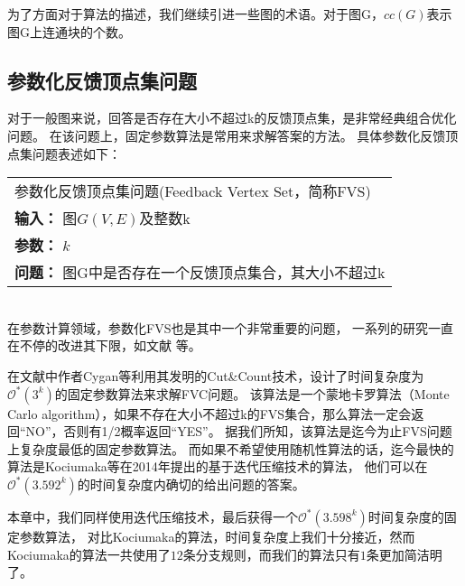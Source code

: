 为了方面对于算法的描述，我们继续引进一些图的术语。对于图G，$cc(G)$表示图G上连通块的个数。

\subsection{参数化反馈顶点集问题}
对于一般图来说，回答是否存在大小不超过k的反馈顶点集，是非常经典组合优化问题。
在该问题上，固定参数算法是常用来求解答案的方法。
具体参数化反馈顶点集问题表述如下：\\

\begin{tabular}{| p{0.9\headwidth} |}
  \hline
  参数化反馈顶点集问题(Feedback Vertex Set，简称FVS) \\
  \textbf{输入：} 图$G(V, E)$及整数k \\
  \textbf{参数：} $k$\\
  \textbf{问题：} 图G中是否存在一个反馈顶点集合，其大小不超过k\\
  \hline
\end{tabular} \vspace{0.5cm} \\

在参数计算领域，参数化FVS也是其中一个非常重要的问题，
一系列的研究一直在不停的改进其下限，如文献\cite{bodlaender1994disjoint,downey1992fixed,downey2012parameterized,raman2006faster,kanj2004parameterized,dehne20072o,guo2006compression,chen2008improved,cao2010feedback,cygan2011solving,kociumaka2014faster} 等。

在文献\cite{cygan2011solving}中作者Cygan等利用其发明的Cut\&Count技术，设计了时间复杂度为$\mathcal{O}^*(3^k)$的固定参数算法来求解FVC问题。
该算法是一个蒙地卡罗算法（Monte Carlo algorithm），如果不存在大小不超过k的FVS集合，那么算法一定会返回“NO”，否则有1/2概率返回“YES”。
据我们所知，该算法是迄今为止FVS问题上复杂度最低的固定参数算法。
而如果不希望使用随机性算法的话，迄今最快的算法是Kociumaka等在2014年提出的基于迭代压缩技术的算法，
他们可以在$\mathcal{O}^*(3.592^k)$的时间复杂度内确切的给出问题的答案。

本章中，我们同样使用迭代压缩技术，最后获得一个$\mathcal{O}^*(3.598^k)$时间复杂度的固定参数算法，
对比Kociumaka的算法，时间复杂度上我们十分接近，然而Kociumaka的算法一共使用了$12$条分支规则，而我们的算法只有$1$条更加简洁明了。

